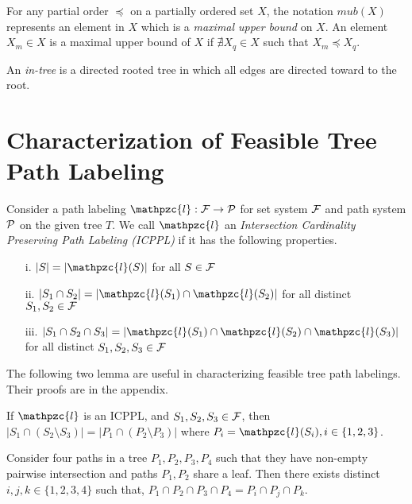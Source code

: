 \documentclass{fsttcs}
\def\cF{{\cal F}}
\def\cP{{\cal P}}
\def\cl{\mathpzc{l}}
\begin{document}
\noindent
For any partial order $\preccurlyeq$ on a partially ordered set $X$,  the notation $mub(X)$ represents an element in $X$ which is
a {\em maximal upper bound} on $X$.  An element $X_m \in X$ is a maximal upper bound of
$X$ if $\nexists X_q \in X$ such that $X_m
\preccurlyeq X_q$. 


\noindent
An {\em in-tree} is a directed rooted tree in which all edges are
directed toward to the root.

\section{Characterization of Feasible Tree Path  Labeling} 
\label{sec:feasible} 

Consider a path labeling $\cl: \cF \rightarrow \cP$ for set system $\cF$
and path system $\cP$ on the given tree $T$. We
call $\cl$ an {\em Intersection Cardinality Preserving Path Labeling
  (ICPPL)} if it has the following properties.

\begin{enumerate}
\item [i.]  $|S| = |\cl(S)|$ for all $S \in \cF$
\item [ii.] $|S_1 \cap S_2| = |\cl(S_1) \cap \cl(S_2)|$ for all
  distinct $S_1, S_2 \in \cF$
\item [iii.] $|S_1 \cap S_2 \cap S_3| = |\cl(S_1) \cap \cl(S_2) \cap
  \cl(S_3)|$ for all distinct  $S_1, S_2, S_3 \in \cF$
\end{enumerate}

The following two lemma are useful in characterizing feasible tree path labelings.  Their
proofs are in the appendix.
\begin{lemma}
  \label{lem:setminuscard}
  If $\cl$ is an ICPPL, and $S_1, S_2, S_3 \in
  \cF$, then $|S_1 \cap (S_2 \setminus S_3)| = |P_1 \cap (P_2
   \setminus P_3)|$ where $P_i = \cl(S_i), i \in \{1, 2, 3\}$.
\end{lemma}
\begin{lemma}\label{lem:fourpaths} 
   Consider four paths in a tree $P_1, P_2, P_3,
  P_4$ such that they have non-empty pairwise intersection and paths $P_1,
  P_2$ share a leaf. Then there exists distinct $i, j, k \in
  \{1,2,3,4\}$ such that, $P_1 \cap P_2 \cap P_3 \cap P_4 = P_i \cap
  P_j \cap P_k$.
\end{lemma}
\end{document}
